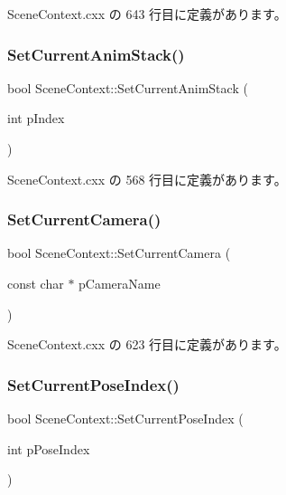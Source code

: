  Scene\+Context.\+cxx の 643 行目に定義があります。

\mbox{\label{class_scene_context_a003a522965333e080d2ac5e8d3e0163e}} 
\subsubsection{\texorpdfstring{Set\+Current\+Anim\+Stack()}{SetCurrentAnimStack()}}
{\footnotesize\ttfamily bool Scene\+Context\+::\+Set\+Current\+Anim\+Stack (\begin{DoxyParamCaption}\item[{int}]{p\+Index }\end{DoxyParamCaption})}



 Scene\+Context.\+cxx の 568 行目に定義があります。

\mbox{\label{class_scene_context_a10d6a89671f4aa66719387a1299db7a9}} 
\subsubsection{\texorpdfstring{Set\+Current\+Camera()}{SetCurrentCamera()}}
{\footnotesize\ttfamily bool Scene\+Context\+::\+Set\+Current\+Camera (\begin{DoxyParamCaption}\item[{const char $\ast$}]{p\+Camera\+Name }\end{DoxyParamCaption})}



 Scene\+Context.\+cxx の 623 行目に定義があります。

\mbox{\label{class_scene_context_a2cd3263d79e2170f7ea3197186540916}} 
\subsubsection{\texorpdfstring{Set\+Current\+Pose\+Index()}{SetCurrentPoseIndex()}}
{\footnotesize\ttfamily bool Scene\+Context\+::\+Set\+Current\+Pose\+Index (\begin{DoxyParamCaption}\item[{int}]{p\+Pose\+Index }\end{DoxyParamCaption})}



